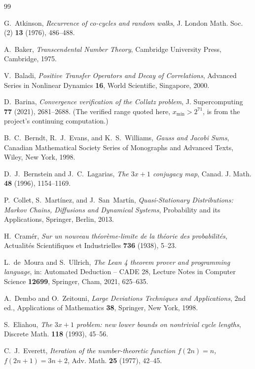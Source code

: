 \documentclass[11pt]{article}
\theoremstyle{plain}
\theoremstyle{definition}
\theoremstyle{remark}
\begin{document}
\begin{thebibliography}{99}

 G.~Atkinson, \emph{Recurrence of co-cycles and random
walks}, J. London Math. Soc. (2) \textbf{13} (1976), 486--488.

 A.~Baker, \emph{Transcendental Number Theory}, Cambridge
University Press, Cambridge, 1975.

 V.~Baladi, \emph{Positive Transfer Operators and Decay of
Correlations}, Advanced Series in Nonlinear Dynamics \textbf{16}, World
Scientific, Singapore, 2000.

 D.~Barina, \emph{Convergence verification of the Collatz
problem}, J. Supercomputing \textbf{77} (2021), 2681--2688. (The verified range
quoted here, $x_{\min}>2^{71}$, is from the project's continuing computation.)

 B.~C.~Berndt, R.~J.~Evans, and K.~S.~Williams, \emph{Gauss
and Jacobi Sums}, Canadian Mathematical Society Series of Monographs and
Advanced Texts, Wiley, New York, 1998.

 D.~J.~Bernstein and J.~C.~Lagarias, \emph{The
$3x+1$ conjugacy map}, Canad. J. Math. \textbf{48} (1996), 1154--1169.

 P.~Collet, S.~Mart\'inez, and J.~San~Mart\'in,
\emph{Quasi-Stationary Distributions: Markov Chains, Diffusions and Dynamical
Systems}, Probability and its Applications, Springer, Berlin, 2013.

 H.~Cram\'er, \emph{Sur un nouveau th\'eor\`eme-limite de
la th\'eorie des probabilit\'es}, Actualit\'es Scientifiques et Industrielles
\textbf{736} (1938), 5--23.

 L.~de~Moura and S.~Ullrich, \emph{The Lean 4 theorem
prover and programming language}, in: Automated Deduction -- CADE 28, Lecture
Notes in Computer Science \textbf{12699}, Springer, Cham, 2021, 625--635.

 A.~Dembo and O.~Zeitouni, \emph{Large Deviations
Techniques and Applications}, 2nd ed., Applications of Mathematics
\textbf{38}, Springer, New York, 1998.

 S.~Eliahou, \emph{The $3x+1$ problem: new lower bounds
on nontrivial cycle lengths}, Discrete Math. \textbf{118} (1993), 45--56.

 C.~J.~Everett, \emph{Iteration of the number-theoretic
function $f(2n)=n$, $f(2n+1)=3n+2$}, Adv. Math. \textbf{25} (1977), 42--45.


\end{thebibliography}
\end{document}
